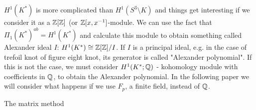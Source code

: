 $H^1(K^*)$ is more complicated than $H^1(S^3\setminus K)$ and things get interesting if we consider it as a $\operatorname{\mathbb{Z}}[\operatorname{\mathbb{Z}}]$ (or $\operatorname{\mathbb{Z}}[x, x^{-1}]$-module. We can use the fact that $\Pi_1(K^*)^{ab}=H^1(K^*)$ and calculate this module to obtain something called Alexander ideal $I$: $H^1(K^*)\cong \operatorname{\mathbb{Z}}[\operatorname{\mathbb{Z}}]/I$. If $I$ is a principal ideal, e.g. in the case of trefoil knot of figure eight knot, its generator is called "Alexander polynomial". If this is not the case, we must consider $H^1(K^*; \operatorname{\mathbb{Q}})$ - kohomology module with coefficients in $\operatorname{\mathbb{Q}}$, to obtain the Alexander polynomial. In the following paper we will consider what happens if we use $F_p$, a finite field, instead of $\operatorname{\mathbb{Q}}$.

The matrix method
